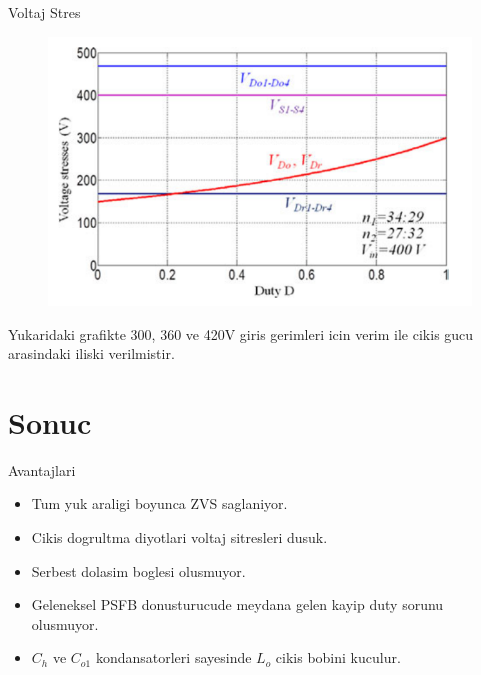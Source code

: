 \documentclass[10pt]{beamer}
\begin{document}
\begin{frame}{Voltaj Stres}
	\begin{figure}
		\centering
		\includegraphics[scale=0.50]{voltage_stress.png}
	\end{figure}
	Yukaridaki grafikte 300, 360 ve 420V giris gerimleri icin verim ile cikis gucu arasindaki iliski verilmistir.
\end{frame}

\section{Sonuc}
\begin{frame}[fragile]{Avantajlari}
	\begin{itemize}
		\item Tum yuk araligi boyunca ZVS saglaniyor.
		\item Cikis dogrultma diyotlari voltaj sitresleri dusuk.
		\item Serbest dolasim boglesi olusmuyor.
		\item Geleneksel PSFB donusturucude meydana gelen kayip duty sorunu olusmuyor.
		\item $C_h$ ve $C_{o1}$ kondansatorleri sayesinde $L_o$ cikis bobini kuculur.
	\end{itemize}
\end{frame}	
\end{document}
